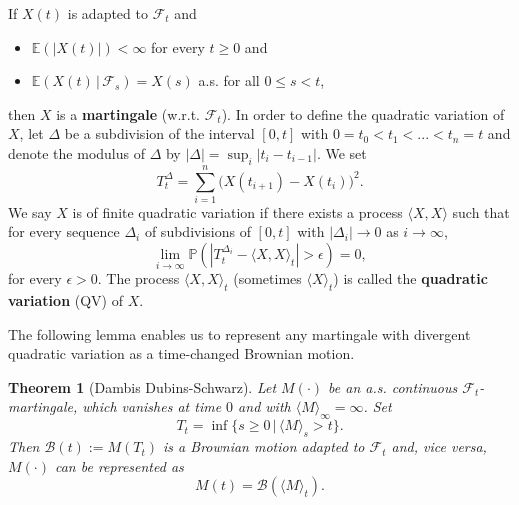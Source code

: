 \documentclass[11pt]{article}
\numberwithin{equation}{section}
\def\Ex{\mathbb{E}}
\def\mydot{\boldsymbol{\cdot}}
\newtheorem{theorem}{Theorem}
\begin{document}
If $X(t)$ is adapted to $\mathcal{F}_t$ and 
\begin{itemize}
  \item $\Ex (|X(t)|) < \infty$ for every $t \geq 0$ and 
  \item $\Ex( X(t) \,|\, \mathcal{F}_s) = X(s)$ a.s. for all $0\leq s < t$,
\end{itemize}
then $X$ is a \textbf{martingale} (w.r.t. $\mathcal{F}_t$).
In order to define the quadratic variation of $X$, 
let $\Delta$ be a subdivision of the interval 
$[0,t]$ with $0 = t_0 < t_1 < ... < t_n = t$ 
and denote the modulus of $\Delta$ by 
$|\Delta| = \sup_i | t_{i} - t_{i-1} | \label{D: modulus of subdicison}$. 
We set 
\begin{equation}\nonumber
  T^{\Delta}_t = \sum_{i=1}^n \big( X(t_{i+1}) - X(t_i) \big)^2.
\end{equation} 
We say $X$ is of finite quadratic variation if there exists 
a process $\langle X,X \rangle$ such that for every sequence 
$\Delta_i$ of subdivisions of $[0,t]$ with 
$|\Delta_i| \rightarrow 0$ as $i \rightarrow \infty$, 
\begin{equation}\label{D: QV}
  \nonumber
  \lim_{i \rightarrow \infty} 
    \mathbb{P} (|T^{\Delta_i}_t - \langle X,X \rangle_t| > \epsilon) = 0,
\end{equation}
for every $\epsilon > 0$. 
The process $\langle X,X \rangle_t$ (sometimes $\langle X \rangle_t$) 
is called the \textbf{quadratic variation} (QV) of $X$. 

The following lemma enables us to represent any martingale 
with divergent quadratic variation as a time-changed Brownian motion. 

\begin{theorem}[Dambis Dubins-Schwarz]
  \label{theorem DDS}
  Let $M(\mydot)$ be an a.s. continuous $\mathcal{F}_t$-martingale,
  which vanishes at time $0$ and with 
  $\langle M \rangle _{\infty}  = \infty$. Set 
  \begin{equation}
    T_t = \inf \{ s \geq 0 \,|\, 
      \langle M \rangle _s > t \}. 
      \nonumber
  \end{equation}
  Then $\mathcal{B}(t) := M(T_t)$ 
  is a Brownian motion adapted to $\mathcal{F}_t$ and, vice versa,  
  $M(\mydot)$ can be represented as   
  \begin{equation}\nonumber
    M(t) = \mathcal{B}( \langle M \rangle_t).
  \end{equation}
\end{theorem}
\end{document}
